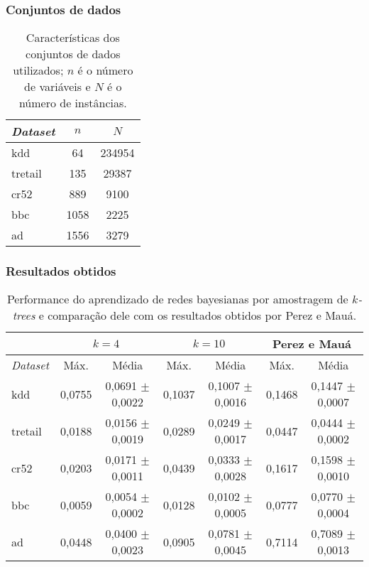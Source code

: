 \documentclass{beamer}
\begin{document}
  \begin{frame}
    \frametitle{Conjuntos de dados}

    \begin{table}
      \centering
      \begin{tabular}{l c c} \hline
        \emph{Dataset} & $n$ & $N$ \\ \hline
        kdd & 64 & 234954 \\
        tretail & 135 & 29387 \\
        cr52 & 889 & 9100 \\
        bbc & 1058 & 2225 \\
        ad & 1556 & 3279 \\ \hline
      \end{tabular}

      \caption{Características dos conjuntos de dados utilizados; $n$ é o número de variáveis e $N$ é o número de instâncias.}
      \label{tab:conjuntos}
    \end{table}
  \end{frame}

  \begin{frame}
    \frametitle{Resultados obtidos}

    \begin{table}
      \centering

      {\tiny
        \begin{tabular}{l c c c c c c} \hline
          & \multicolumn{2}{c}{$k = 4$} & \multicolumn{2}{c}{$k = 10$} & \multicolumn{2}{c}{Perez e Mauá} \\ \hline
          \emph{Dataset} & Máx. & Média & Máx. & Média & Máx. & Média \\ \hline
          kdd & 0,0755 & 0,0691 $\pm$ 0,0022 & 0,1037 & 0,1007 $\pm$ 0,0016 & 0,1468 & 0,1447 $\pm$ 0,0007 \\
          tretail & 0,0188 & 0,0156 $\pm$ 0,0019 & 0,0289 & 0,0249 $\pm$ 0,0017 & 0,0447 & 0,0444 $\pm$ 0,0002 \\
          cr52 & 0,0203 & 0,0171 $\pm$ 0,0011 & 0,0439 & 0,0333 $\pm$ 0,0028 & 0,1617 & 0,1598 $\pm$ 0,0010 \\
          bbc & 0,0059 & 0,0054 $\pm$ 0,0002 & 0,0128 & 0,0102 $\pm$ 0,0005 & 0,0777 & 0,0770 $\pm$ 0,0004 \\
          ad & 0,0448 & 0,0400 $\pm$ 0,0023 & 0,0905 & 0,0781 $\pm$ 0,0045 & 0,7114 & 0,7089 $\pm$ 0,0013 \\ \hline
        \end{tabular}
      }

      \caption{Performance do aprendizado de redes bayesianas por amostragem de \emph{$k$-trees} e comparação dele com os resultados obtidos por Perez e Mauá.}
      \label{tab:comparacao}
    \end{table}
  \end{frame}
\end{document}
